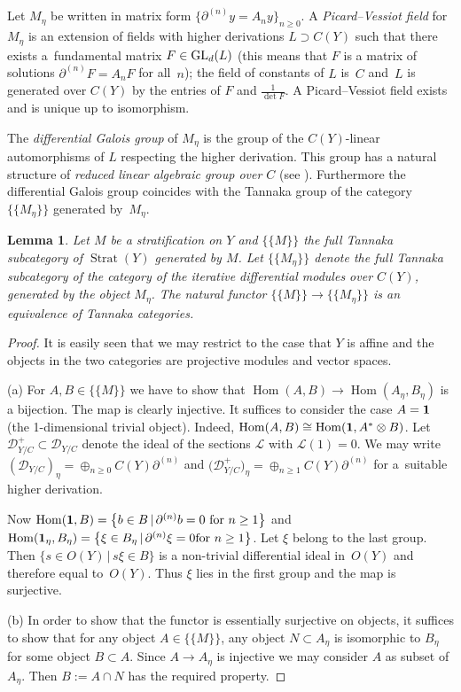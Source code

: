 \documentclass[pdftex]{sigma}
\numberwithin{equation}{section}
\newtheorem{Lemma}[Theorem]{Lemma}
\begin{document}
Let $M_\eta$ be written in matrix form $\big\{ \partial^{(n)}y=A_ny\big\}_{n\geq 0}$. A {\it Picard--Vessiot field} for $M_\eta$ is an extension of fields with higher derivations $L\supset C(Y)$ such that there exists a~fundamental matrix $F\in {\rm GL}_d(L)$ (this means that $F$ is a matrix of solutions $ \partial^{(n)}F=A_nF$ for all~$n$); the field of constants of $L$ is~$C$ and~$L$ is generated over $C(Y)$ by the entries of $F$ and $\frac{1}{\det F}$. A Picard--Vessiot field exists and is unique up to isomorphism.

The {\it differential Galois group} of $M_\eta$ is the group of the $C(Y)$-linear automorphisms of $L$ respecting the higher derivation. This group has a natural structure of {\it reduced linear algebraic group over $C$} (see \cite[p.~8]{Ma-vdP1}). Furthermore the differential Galois group coincides with the Tannaka group of the category $\{\{ M_\eta \}\}$ generated by~$M_\eta$.

\begin{Lemma}\label{2.*} Let $M$ be a stratification on $Y$ and $\{\{M\}\}$ the full Tannaka subcategory of $\operatorname{Strat}(Y)$ generated by $M$. Let $\{\{M_\eta \}\}$ denote the full Tannaka subcategory of the category of the iterative differential modules over $C(Y)$, generated by the object $M_\eta$. The natural functor $\{\{M\}\}\rightarrow \{\{M_\eta \}\}$ is an equivalence of Tannaka categories.
\end{Lemma}
\begin{proof} It is easily seen that we may restrict to the case that $Y$ is affine and the objects in the two categories are projective modules and vector spaces.

 (a) For $A,B\in \{\{M\}\}$ we have to show that $\operatorname{Hom}(A,B)\rightarrow \operatorname{Hom}(A_\eta ,B_\eta)$ is a bijection. The map is clearly injective. It suffices to consider the case $A=\bf{1}$ (the 1-dimensional trivial object). Indeed, $\operatorname{Hom}(A,B)\cong \operatorname{Hom}({\bf 1}, A^*\otimes B)$. Let $\mathcal{D}^+_{Y/C}\subset \mathcal{D}_{Y/C}$ denote the ideal of the sections $\mathcal{L}$ with $\mathcal{L}(1)=0$. We may write $(\mathcal{D}_{Y/C})_\eta=\oplus _{n\geq 0}C(Y) \partial ^{(n)}$ and $\big(\mathcal{D}^+_{Y/C}\big)_\eta=\oplus _{n\geq 1}C(Y) \partial ^{(n)}$ for a~suitable higher derivation.

Now $\operatorname{Hom}({\bf 1},B)=\big\{ b\in B\,|\, \partial ^{(n)}b=0 \ \text{for} \ n\geq 1\big\}$ and $\operatorname{Hom}({\bf 1}_\eta,B_\eta)=\big\{\xi \in B_\eta \, | \, \partial ^{(n)}\xi =0 \allowbreak \text{for} \ n\geq 1\big\}$. Let $\xi$ belong to the last group. Then $\{s\in O(Y)\, | \, s\xi \in B\}$ is a non-trivial differential ideal in~$O(Y)$ and therefore equal to~$O(Y)$. Thus $\xi$ lies in the first group and the map is surjective.

(b) In order to show that the functor is essentially surjective on objects, it suffices to show that for any object $A\in \{\{M\}\}$, any object $N\subset A_\eta$ is isomorphic to $B_\eta$ for some object $B\subset A$. Since $A\rightarrow A_\eta$ is injective we may consider $A$ as subset of $A_\eta$. Then $B:=A\cap N$ has the required property. \end{proof}
\end{document}
